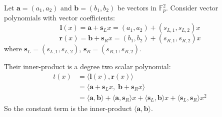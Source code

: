 \documentclass[../../book.tex]{subfiles}
\begin{document}
\begin{example}
Let $\mathbf{a} = (a_1, a_2)$ and $\mathbf{b} = (b_1, b_2)$ be vectors in $\mathbb{F}_p^2$. Consider vector polynomials with vector coefficients:
\[
\mathbf{l}(x) = \mathbf{a} + \mathbf{s}_L x = (a_1, a_2) + (s_{L,1}, s_{L,2}) x
\]
\[
\mathbf{r}(x) = \mathbf{b} + \mathbf{s}_R x = (b_1, b_2) + (s_{R,1}, s_{R,2}) x
\]
where $\mathbf{s}_L = (s_{L,1}, s_{L,2})$, $\mathbf{s}_R = (s_{R,1}, s_{R,2})$.

Their inner-product is a degree two scalar polynomial:
\begin{align*}
t(x) &= \langle \mathbf{l}(x), \mathbf{r}(x) \rangle \\
    &= \langle \mathbf{a} + \mathbf{s}_L x,\; \mathbf{b} + \mathbf{s}_R x \rangle \\
    &= \langle \mathbf{a}, \mathbf{b} \rangle + \langle \mathbf{a}, \mathbf{s}_R \rangle x + \langle \mathbf{s}_L, \mathbf{b} \rangle x + \langle \mathbf{s}_L, \mathbf{s}_R \rangle x^2
\end{align*}
So the constant term is the inner-product $\langle \mathbf{a}, \mathbf{b} \rangle$.
\end{example}
\end{document}
